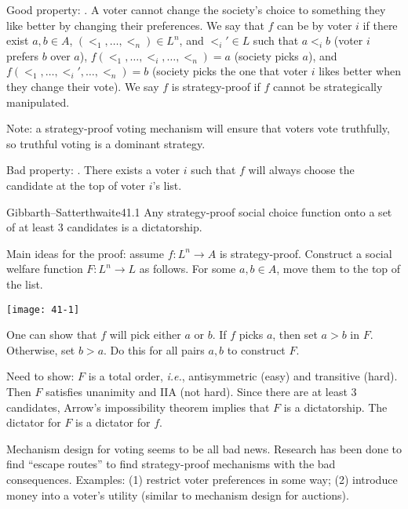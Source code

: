 \documentclass[12pt,letterpaper]{report}
\begin{document}
Good property: .
A voter cannot change the society's choice to something they like better by changing their
preferences.
We say that $f$ can be  by voter $i$ if there exist $a, b \in A$,
$(<_1, \ldots, <_n) \in L^n$, and $<_i' \in L$ such that $a <_i b$ (voter $i$ prefers $b$ over $a$),
$f(<_1, \ldots, <_i, \ldots, <_n) = a$ (society picks $a$), and
$f(<_1, \ldots, <_i', \ldots, <_n) = b$ (society picks the one that voter $i$ likes better when they
change their vote).
We say $f$ is strategy-proof if $f$ cannot be strategically manipulated.

Note: a strategy-proof voting mechanism will ensure that voters vote truthfully, so truthful voting
is a dominant strategy.

Bad property: .
There exists a voter $i$ such that $f$ will always choose the candidate at the top of voter $i$'s
list.

\begin{thm}{Gibbarth--Satterthwaite}{41.1}
  Any strategy-proof social choice function onto a set of at least 3 candidates is a dictatorship.
\end{thm}

Main ideas for the proof: assume $f \colon L^n \to A$ is strategy-proof.
Construct a social welfare function $F \colon L^n \to L$ as follows.
For some $a, b \in A$, move them to the top of the list.
\begin{center}
  \texttt{[image: 41-1]}
\end{center}
One can show that $f$ will pick either $a$ or $b$.
If $f$ picks $a$, then set $a > b$ in $F$.
Otherwise, set $b > a$.
Do this for all pairs $a, b$ to construct $F$.

Need to show: $F$ is a total order, \emph{i.e.}, antisymmetric (easy) and transitive (hard).
Then $F$ satisfies unanimity and IIA (not hard).
Since there are at least 3 candidates, Arrow's impossibility theorem implies that $F$ is a
dictatorship.
The dictator for $F$ is a dictator for $f$.

Mechanism design for voting seems to be all bad news.
Research has been done to find ``escape routes'' to find strategy-proof mechanisms with the bad
consequences.
Examples: (1) restrict voter preferences in some way; (2) introduce money into a voter's utility
(similar to mechanism design for auctions).
\end{document}

